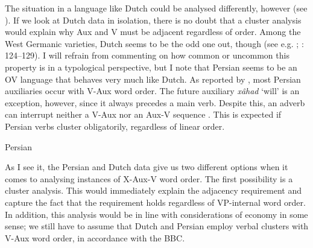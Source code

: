 \documentclass[output=paper, colorlinks, citecolor=brown]{langscibook}
\begin{document}
The situation in a language like Dutch could be analysed differently, however (see ). If we look at Dutch data in isolation, there is no doubt that a cluster analysis would explain why Aux and V must be adjacent regardless of order. Among the West Germanic varieties, Dutch seems to be the odd one out, though (see e.g. \citealt{Haegeman1992}; \citealt{Sapp2011}: 124–129). I will refrain from commenting on how common or uncommon this property is in a typological perspective, but I note that Persian seems to be an OV language that behaves very much like Dutch. As reported by \citet[100]{Sheehan2017Final}, most Persian auxiliaries occur with V-Aux word order. The future auxiliary \textit{xâhad} ‘will’ is an exception, however, since it always precedes a main verb. Despite this, an adverb can interrupt neither a V-Aux  nor an Aux-V sequence . This is expected if Persian verbs cluster obligatorily, regardless of linear order.

\ea Persian
\label{ex:sangfelt:32}

\z 
\z


As I see it, the Persian and Dutch data give us two different options when it comes to analysing instances of X-Aux-V word order. The first possibility is a cluster analysis. This would immediately explain the adjacency requirement and capture the fact that the requirement holds regardless of VP-internal word order. In addition, this analysis would be in line with considerations of economy in some sense; we still have to assume that Dutch and Persian employ verbal clusters with V-Aux word order, in accordance with the BBC. 
\end{document}
